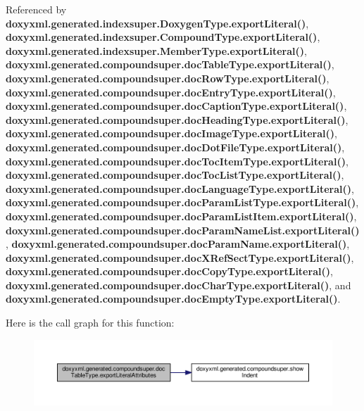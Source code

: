 Referenced by {\bf doxyxml.\+generated.\+indexsuper.\+Doxygen\+Type.\+export\+Literal()}, {\bf doxyxml.\+generated.\+indexsuper.\+Compound\+Type.\+export\+Literal()}, {\bf doxyxml.\+generated.\+indexsuper.\+Member\+Type.\+export\+Literal()}, {\bf doxyxml.\+generated.\+compoundsuper.\+doc\+Table\+Type.\+export\+Literal()}, {\bf doxyxml.\+generated.\+compoundsuper.\+doc\+Row\+Type.\+export\+Literal()}, {\bf doxyxml.\+generated.\+compoundsuper.\+doc\+Entry\+Type.\+export\+Literal()}, {\bf doxyxml.\+generated.\+compoundsuper.\+doc\+Caption\+Type.\+export\+Literal()}, {\bf doxyxml.\+generated.\+compoundsuper.\+doc\+Heading\+Type.\+export\+Literal()}, {\bf doxyxml.\+generated.\+compoundsuper.\+doc\+Image\+Type.\+export\+Literal()}, {\bf doxyxml.\+generated.\+compoundsuper.\+doc\+Dot\+File\+Type.\+export\+Literal()}, {\bf doxyxml.\+generated.\+compoundsuper.\+doc\+Toc\+Item\+Type.\+export\+Literal()}, {\bf doxyxml.\+generated.\+compoundsuper.\+doc\+Toc\+List\+Type.\+export\+Literal()}, {\bf doxyxml.\+generated.\+compoundsuper.\+doc\+Language\+Type.\+export\+Literal()}, {\bf doxyxml.\+generated.\+compoundsuper.\+doc\+Param\+List\+Type.\+export\+Literal()}, {\bf doxyxml.\+generated.\+compoundsuper.\+doc\+Param\+List\+Item.\+export\+Literal()}, {\bf doxyxml.\+generated.\+compoundsuper.\+doc\+Param\+Name\+List.\+export\+Literal()}, {\bf doxyxml.\+generated.\+compoundsuper.\+doc\+Param\+Name.\+export\+Literal()}, {\bf doxyxml.\+generated.\+compoundsuper.\+doc\+X\+Ref\+Sect\+Type.\+export\+Literal()}, {\bf doxyxml.\+generated.\+compoundsuper.\+doc\+Copy\+Type.\+export\+Literal()}, {\bf doxyxml.\+generated.\+compoundsuper.\+doc\+Char\+Type.\+export\+Literal()}, and {\bf doxyxml.\+generated.\+compoundsuper.\+doc\+Empty\+Type.\+export\+Literal()}.



Here is the call graph for this function\+:
\nopagebreak
\begin{figure}[H]
\begin{center}
\leavevmode
\includegraphics[width=350pt]{d9/d0e/classdoxyxml_1_1generated_1_1compoundsuper_1_1docTableType_a685dce666fecda68629bde8bc39d3c0a_cgraph}
\end{center}
\end{figure}




